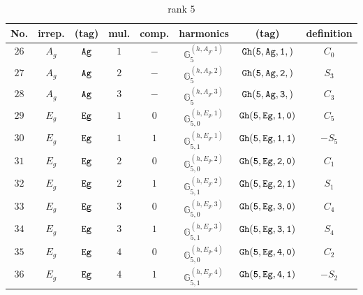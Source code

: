 \documentclass[fleqn,8pt]{jsarticle}
\begin{document}
\begin{table}[ht!]
\begin{center}
\caption{rank 5}
\renewcommand{\arraystretch}{1.3}
\begin{tabular}{cccccccc} \hline \hline
No. & irrep. & (tag) & mul. & comp. & harmonics & (tag) & definition \\ \hline
$ 26 $ & $ A_{g} $ & $ {\tt Ag} $ & $ 1 $ & $ - $ & $ \mathbb{G}_{5}^{(h,A_{g},1)} $ & $ {\tt Gh(5,Ag,1,)} $ & $ C_{0} $ \\
$ 27 $ & $ A_{g} $ & $ {\tt Ag} $ & $ 2 $ & $ - $ & $ \mathbb{G}_{5}^{(h,A_{g},2)} $ & $ {\tt Gh(5,Ag,2,)} $ & $ S_{3} $ \\
$ 28 $ & $ A_{g} $ & $ {\tt Ag} $ & $ 3 $ & $ - $ & $ \mathbb{G}_{5}^{(h,A_{g},3)} $ & $ {\tt Gh(5,Ag,3,)} $ & $ C_{3} $ \\
$ 29 $ & $ E_{g} $ & $ {\tt Eg} $ & $ 1 $ & $ 0 $ & $ \mathbb{G}_{5,0}^{(h,E_{g},1)} $ & $ {\tt Gh(5,Eg,1,0)} $ & $ C_{5} $ \\
$ 30 $ & $ E_{g} $ & $ {\tt Eg} $ & $ 1 $ & $ 1 $ & $ \mathbb{G}_{5,1}^{(h,E_{g},1)} $ & $ {\tt Gh(5,Eg,1,1)} $ & $ - S_{5} $ \\
$ 31 $ & $ E_{g} $ & $ {\tt Eg} $ & $ 2 $ & $ 0 $ & $ \mathbb{G}_{5,0}^{(h,E_{g},2)} $ & $ {\tt Gh(5,Eg,2,0)} $ & $ C_{1} $ \\
$ 32 $ & $ E_{g} $ & $ {\tt Eg} $ & $ 2 $ & $ 1 $ & $ \mathbb{G}_{5,1}^{(h,E_{g},2)} $ & $ {\tt Gh(5,Eg,2,1)} $ & $ S_{1} $ \\
$ 33 $ & $ E_{g} $ & $ {\tt Eg} $ & $ 3 $ & $ 0 $ & $ \mathbb{G}_{5,0}^{(h,E_{g},3)} $ & $ {\tt Gh(5,Eg,3,0)} $ & $ C_{4} $ \\
$ 34 $ & $ E_{g} $ & $ {\tt Eg} $ & $ 3 $ & $ 1 $ & $ \mathbb{G}_{5,1}^{(h,E_{g},3)} $ & $ {\tt Gh(5,Eg,3,1)} $ & $ S_{4} $ \\
$ 35 $ & $ E_{g} $ & $ {\tt Eg} $ & $ 4 $ & $ 0 $ & $ \mathbb{G}_{5,0}^{(h,E_{g},4)} $ & $ {\tt Gh(5,Eg,4,0)} $ & $ C_{2} $ \\
$ 36 $ & $ E_{g} $ & $ {\tt Eg} $ & $ 4 $ & $ 1 $ & $ \mathbb{G}_{5,1}^{(h,E_{g},4)} $ & $ {\tt Gh(5,Eg,4,1)} $ & $ - S_{2} $ \\
 \hline \hline
\end{tabular}
\end{center}
\end{table}
\end{document}
